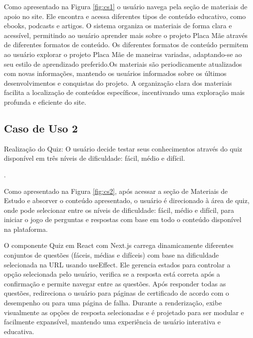 Como apresentado na Figura \ref{fig:cs1} o usuário navega pela seção de materiais de apoio no site. Ele encontra e acessa diferentes tipos de conteúdo educativo, como ebooks, podcasts e artigos. O sistema organiza os materiais de forma clara e acessível, permitindo ao usuário aprender mais sobre o projeto Placa Mãe através de diferentes formatos de conteúdo. Os diferentes formatos de conteúdo permitem ao usuário explorar o projeto Placa Mãe de maneiras variadas, adaptando-se ao seu estilo de aprendizado preferido.Os materiais são periodicamente atualizados com novas informações, mantendo os usuários informados sobre os últimos desenvolvimentos e conquistas do projeto. A organização clara dos materiais facilita a localização de conteúdos específicos, incentivando uma exploração mais profunda e eficiente do site.

\subsection{Caso de Uso 2}
Realização do Quiz: O usuário decide testar seus conhecimentos através do quiz disponível em três níveis de dificuldade: fácil, médio e difícil.

.


Como apresentado na Figura \ref{fig:cs2}, após acessar a seção de Materiais de Estudo e absorver o conteúdo apresentado, o usuário é direcionado à área de quiz, onde pode selecionar entre os níveis de dificuldade: fácil, médio e difícil, para iniciar o jogo de perguntas e respostas com base em todo o conteúdo disponível na plataforma.

O componente Quiz em React com Next.js carrega dinamicamente diferentes conjuntos de questões (fáceis, médias e difíceis) com base na dificuldade selecionada na URL usando useEffect. Ele gerencia estados para controlar a opção selecionada pelo usuário, verifica se a resposta está correta após a confirmação e permite navegar entre as questões. Após responder todas as questões, redireciona o usuário para páginas de certificado de acordo com o desempenho ou para uma página de falha. Durante a renderização, exibe visualmente as opções de resposta selecionadas e é projetado para ser modular e facilmente expansível, mantendo uma experiência de usuário interativa e educativa.

